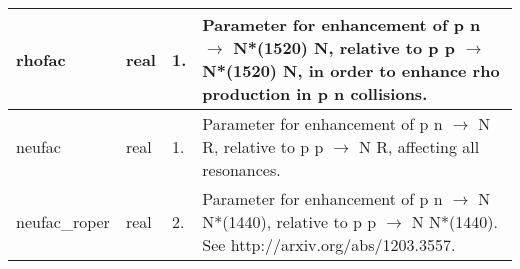 \documentclass{article}
\begin{document}
\begin{longtable}{llll}
\midrule
rhofac & \begin{minipage}[t]{2cm}real\end{minipage} & \begin{minipage}[t]{2cm}1.\end{minipage} & \begin{minipage}[t]{12cm}Parameter for enhancement of p n $\rightarrow$ N*(1520) N, relative to p p $\rightarrow$ N*(1520) N, in order to enhance rho production in p n collisions.\end{minipage}\\*
\midrule
neufac & \begin{minipage}[t]{2cm}real\end{minipage} & \begin{minipage}[t]{2cm}1.\end{minipage} & \begin{minipage}[t]{12cm}Parameter for enhancement of p n $\rightarrow$ N R, relative to  p p $\rightarrow$ N R, affecting all resonances.\end{minipage}\\*
\midrule
neufac\_roper & \begin{minipage}[t]{2cm}real\end{minipage} & \begin{minipage}[t]{2cm}2.\end{minipage} & \begin{minipage}[t]{12cm}Parameter for enhancement of p n $\rightarrow$ N N*(1440), relative to p p $\rightarrow$ N N*(1440). See http://arxiv.org/abs/1203.3557.\end{minipage}\\*
\bottomrule
\end{longtable}
{ }



\end{document}
